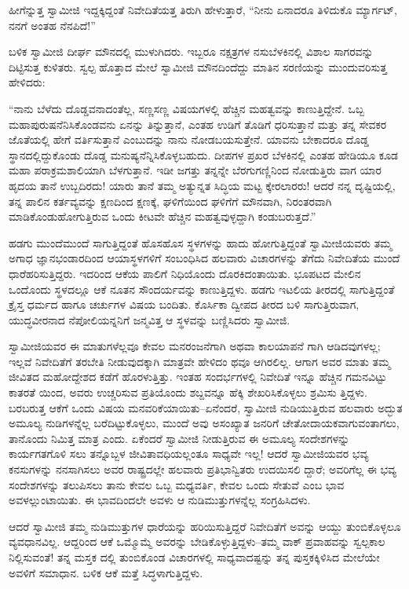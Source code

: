 ಹೀಗೆನ್ನುತ್ತ ಸ್ವಾಮೀಜಿ ಇದ್ದಕ್ಕಿದ್ದಂತೆ ನಿವೇದಿತೆಯತ್ತ ತಿರುಗಿ ಹೇಳುತ್ತಾರೆ, “ನೀನು ಏನಾದರೂ ತಿಳಿದುಕೊ ಮ್ಯಾರ್ಗಟ್, ನನಗೆ ಅಂತಹ ನೆನಪಿದೆ!”

ಬಳಿಕ ಸ್ವಾಮೀಜಿ ದೀರ್ಘ ಮೌನದಲ್ಲಿ ಮುಳುಗಿದರು. ಇಬ್ಬರೂ ನಕ್ಷತ್ರಗಳ ನಸುಬೆಳಕಿನಲ್ಲಿ ವಿಶಾಲ ಸಾಗರವನ್ನು ದಿಟ್ಟಿಸುತ್ತ ಕುಳಿತರು. ಸ್ವಲ್ಪ ಹೊತ್ತಾದ ಮೇಲೆ ಸ್ವಾಮೀಜಿ ಮೌನದಿಂದೆದ್ದು ಮಾತಿನ ಸರಣಿಯನ್ನು ಮುಂದುವರಿಸುತ್ತ ಹೇಳಿದರು:

“ನಾನು ಬೆಳೆದು ದೊಡ್ಡವನಾದಂತೆಲ್ಲ, ಸಣ್ಣಸಣ್ಣ ವಿಷಯಗಳಲ್ಲಿ ಹೆಚ್ಚಿನ ಮಹತ್ವವನ್ನು ಕಾಣುತ್ತಿದ್ದೇನೆ. ಒಬ್ಬ ಮಹಾಪುರುಷನೆನಿಸಿಕೊಂಡವನು ಏನನ್ನು ತಿನ್ನುತ್ತಾನೆ, ಎಂತಹ ಉಡಿಗೆ ತೊಡಿಗೆ ಧರಿಸುತ್ತಾನೆ ಮತ್ತು ತನ್ನ ಸೇವಕರ ಜೊತೆಯಲ್ಲಿ ಹೇಗೆ ವರ್ತಿಸುತ್ತಾನೆ ಎಂಬುದನ್ನು ನಾನು ನೋಡಬಯಸುತ್ತೇನೆ. ಯಾವನು ಬೇಕಾದರೂ ದೊಡ್ಡ ಸ್ಥಾನದಲ್ಲಿದ್ದುಕೊಂಡು ದೊಡ್ಡ ಮನುಷ್ಯನೆನ್ನಿಸಿಕೊಳ್ಳಬಹುದು. ದೀಪಗಳ ಪ್ರಖರ ಬೆಳಕಿನಲ್ಲಿ ಎಂತಹ ಹೇಡಿಯೂ ಕೂಡ ಮಹಾ ಪರಾಕ್ರಮಶಾಲಿಯಾಗಿ ಬೆಳಗುತ್ತಾನೆ. ಇಡೀ ಜಗತ್ತು ತನ್ನನ್ನೇ ಬೆರಗುಗಣ್ಣಿನಿಂದ ನೋಡುತ್ತಿರು ವಾಗ ಯಾರ ಹೃದಯ ತಾನೆ ಉಬ್ಬದಿರದು! ಯಾರು ತಾನೆ ತಮ್ಮ ಅತ್ಯುನ್ನತ ಸಿದ್ಧಿಯ ಮಟ್ಟ ಕ್ಕೇರಲಾರರು! ಆದರೆ ನನ್ನ ದೃಷ್ಟಿಯಲ್ಲಿ, ತನ್ನ ಪಾಲಿನ ಕರ್ತವ್ಯವನ್ನು ಕ್ಷಣದಿಂದ ಕ್ಷಣಕ್ಕೆ, ಘಳಿಗೆಯಿಂದ ಘಳಿಗೆಗೆ ಮೌನವಾಗಿ, ನಿರಂತರವಾಗಿ ಮಾಡಿಕೊಂಡುಹೋಗುತ್ತಿರುವ ಒಂದು ಕೀಟವೇ ಹೆಚ್ಚಿನ ಮಹತ್ವವುಳ್ಳದ್ದಾಗಿ ಕಂಡುಬರುತ್ತದೆ.”

ಹಡಗು ಮುಂದೆಮುಂದೆ ಸಾಗುತ್ತಿದ್ದಂತೆ ಹೊಸಹೊಸ ಸ್ಥಳಗಳನ್ನು ಹಾದು ಹೋಗುತ್ತಿದ್ದಂತೆ ಸ್ವಾಮೀಜಿಯವರು ತಮ್ಮ ಅಗಾಧ ಜ್ಞಾನಭಂಡಾರದಿಂದ ಆಯಾಸ್ಥಳಗಳಿಗೆ ಸಂಬಂಧಿಸಿದ ಹಲವಾರು ವಿಚಾರಗಳನ್ನು ತೆಗೆದು ನಿವೇದಿತೆಯ ಮುಂದೆ ಧಾರೆಹರಿಸುತ್ತಿದ್ದರು. ಇದರಿಂದ ಆಕೆಯ ಪಾಲಿಗೆ ನಿಧಿಯೊಂದು ದೊರಕಿದಂತಾಯಿತು. ಭೂಪಟದ ಮೇಲಿನ ಒಂದೊಂದು ಸ್ಥಳದಲ್ಲೂ ಆಕೆ ನೂತನ ಸೌಂದರ್ಯವನ್ನು ಕಾಣುತ್ತಿದ್ದಳು. ಹಡಗು ಇಟಲಿಯ ತೀರದಲ್ಲಿ ಸಾಗುತ್ತಿದ್ದಂತೆ ಕ್ರೈಸ್ತ ಧರ್ಮದ ಹಾಗೂ ಚರ್ಚುಗಳ ವಿಷಯ ಬಂದಿತು. ಕೊರ್ಸಿಕಾ ದ್ವೀಪದ ತೀರದ ಬಳಿ ಸಾಗುತ್ತಿರುವಾಗ, ಯುದ್ಧವೀರನಾದ ನೆಪೋಲಿಯನ್ನನಿಗೆ ಜನ್ಮವಿತ್ತ ಆ ಸ್ಥಳವನ್ನು ಬಣ್ಣಿಸಿದರು ಸ್ವಾಮೀಜಿ.

ಸ್ವಾಮೀಜಿಯವರ ಈ ಮಾತುಗಳೆಲ್ಲವೂ ಕೇವಲ ಮನರಂಜನೆಗಾಗಿ ಅಥವಾ ಕಾಲಯಾಪನೆ ಗಾಗಿ ಆಡಿದವುಗಳಲ್ಲ; ಇಲ್ಲವೆ ನಿವೇದಿತೆಗೆ ತರಬೇತಿ ನೀಡುವುದಕ್ಕಾಗಿ ಮಾತ್ರವೇ ಹೇಳಿದಂ ಥವೂ ಆಗಿರಲಿಲ್ಲ. ಆಗಾಗ ಅವರ ಮಾತು ತಮ್ಮ ಜೀವಿತದ ಮಹೋದ್ದೇಶದ ಕಡೆಗೆ ಹೊರಳುತ್ತಿತ್ತು. ಇಂತಹ ಸಂದರ್ಭಗಳಲ್ಲಿ ನಿವೇದಿತೆ ಇನ್ನೂ ಹೆಚ್ಚಿನ ಗಮನವಿಟ್ಟು ಕಾತರತೆ ಯಿಂದ, ಅವರು ಉಚ್ಚರಿಸುವ ಪ್ರತಿಯೊಂದು ಶಬ್ದವನ್ನೂ ಹೆಕ್ಕಿ ಶೇಖರಿಸಿಕೊಳ್ಳಲು ಶ್ರಮಿಸು ತ್ತಿದ್ದಳು. ಬರಬರುತ್ತ ಆಕೆಗೆ ಒಂದು ವಿಷಯ ಮನವರಿಕೆಯಾಯಿತು–ಏನೆಂದರೆ, ಸ್ವಾಮೀಜಿ ನುಡಿಯುತ್ತಿರುವ ಹಲವಾರು ಅದ್ಭುತ ಅಮೂಲ್ಯ ನುಡಿಗಳನ್ನೆಲ್ಲ ಬರೆದಿಟ್ಟುಕೊಳ್ಳಲು, ಮುಂದೆ ಅವು ಅಸಂಖ್ಯಾತ ಜನರಿಗೆ ಚೇತೋದಾಯಕವಾಗುವಂತಾಗಲು, ತಾನೊಂದು ನಿಮಿತ್ತ ಮಾತ್ರ ಎಂದು. ಏಕೆಂದರೆ ಸ್ವಾಮೀಜಿ ನೀಡುತ್ತಿರುವ ಈ ಅಮೂಲ್ಯ ಸಂದೇಶಗಳನ್ನು ಕಾರ್ಯಗತಗೊಳಿ ಸಲು ತನ್ನೊಬ್ಬಳ ಜೀವಿತಾವಧಿಯಲ್ಲಂತೂ ಸಾಧ್ಯವೇ ಇಲ್ಲ! ಆದರೆ ಸ್ವಾಮೀಜಿಯವರ ಭವ್ಯ ಕನಸುಗಳನ್ನು ನನಸಾಗಿಸಲು ಅವರ ರಾಷ್ಟ್ರದಲ್ಲೇ ಹಲವಾರು ಪ್ರತಿಭಾನ್ವಿತರು ಉದಯಿಸಲಿ ದ್ದಾರೆ; ಅವರಿಗೆಲ್ಲ ಈ ಭವ್ಯ ಸಂದೇಶಗಳನ್ನು ತಲುಪಿಸಲು ತಾನು ಕೇವಲ ಒಬ್ಬ ಮಧ್ಯವರ್ತಿ, ಕೇವಲ ಒಂದು ಸೇತುವೆ ಎಂಬ ಭಾವ ಅವಳಲ್ಲುಂಟಾಯಿತು. ಈ ಭಾವದಿಂದಲೇ ಅವಳು ಆ ನುಡಿಮುತ್ತುಗಳನ್ನೆಲ್ಲ ಸಂಗ್ರಹಿಸಿದಳು.

ಆದರೆ ಸ್ವಾಮೀಜಿ ತಮ್ಮ ನುಡಿಮುತ್ತುಗಳ ಧಾರೆಯನ್ನು ಹರಿಯಿಸುತ್ತಿದ್ದರೆ ನಿವೇದಿತೆಗೆ ಅವನ್ನು ಆಯ್ದು ತುಂಬಿಕೊಳ್ಳಲೂ ವ್ಯವಧಾನವಿಲ್ಲ. ಆದ್ದರಿಂದ ಆಕೆ ಒಮ್ಮೊಮ್ಮೆ ಅವರನ್ನು ಬೇಡಿಕೊಳ್ಳುತ್ತಿದ್ದಳು–ತಮ್ಮ ವಾಕ್ ಪ್ರವಾಹವನ್ನು ಸ್ವಲ್ಪಕಾಲ ನಿಲ್ಲಿಸುವಂತೆ! ತನ್ನ ಮಸ್ತಕ ದಲ್ಲಿ ತುಂಬಿಕೊಂಡ ವಿಚಾರಗಳಲ್ಲಿ ಸಾಧ್ಯವಾದಷ್ಟನ್ನು ತನ್ನ ಪುಸ್ತಕಕ್ಕಿಳಿಸಿದ ಮೇಲೆಯೇ ಅವಳಿಗೆ ಸಮಾಧಾನ. ಬಳಿಕ ಆಕೆ ಮತ್ತೆ ಸಿದ್ಧಳಾಗುತ್ತಿದ್ದಳು.

